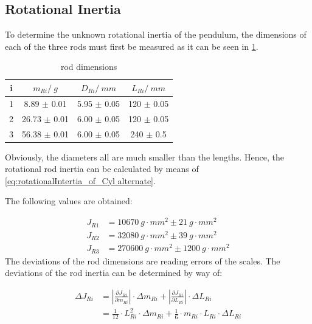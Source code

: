         \subsection{Rotational Inertia}
            To determine the unknown rotational inertia of the pendulum, the dimensions of each of the three rods must first be measured
            as it can be seen in \cref{rod dimensions}.\par
            \begin{table}[H]
                \centering
                \caption{rod dimensions}
                \label{rod dimensions}
                \begin{tabular}{|c|c|c|c|}
                    \hline
                    i & $ m_{Ri} / \SI{}{g} $ & $ D_{Ri} / \SI{}{mm} $ & $ L_{Ri} / \SI{}{mm} $ \\
                    \hline
                    \hline
                    1 & 8.89 $\pm$ 0.01 & 5.95 $\pm$ 0.05 & 120 $\pm$ 0.05 \\
                    \hline
                    2 & 26.73 $\pm$ 0.01 & 6.00 $\pm$ 0.05 & 120 $\pm$ 0.05 \\
                    \hline
                    3 & 56.38 $\pm$ 0.01 & 6.00 $\pm$ 0.05 & 240 $\pm$ 0.5 \\
                    \hline
                \end{tabular}
            \end{table}
            Obviously, the diameters all are much smaller than the lengths. Hence, the rotational rod inertia can be calculated
            by means of \cref{eq:rotationalIntertia_of_Cyl alternate}.\par
            The following values are obtained:\par
            \begin{align}
                J_{R1}  &=\SI{10670}{g\cdot mm^2} \pm \SI{21}{g\cdot mm^2}\\
                J_{R2}  &=\SI{32080}{g\cdot mm^2} \pm \SI{39}{g\cdot mm^2}\\
                J_{R3}  &=\SI{270600}{g\cdot mm^2} \pm \SI{1200}{g\cdot mm^2}
            \end{align}
            The deviations of the rod dimensions are reading errors of the scales. The deviations of the rod inertia can be determined by way of:\par
            \begin{align}
                \Delta J_{Ri}   &=\left| \frac{\partial J_{Ri}}{\partial m_{Ri}} \right| \cdot \Delta m_{Ri} + \left| \frac{\partial J_{Ri}}{\partial L_{Ri}} \right| \cdot \Delta L_{Ri} \nonumber\\
                                &=\frac{1}{12}\cdot L_{Ri}^2\cdot \Delta m_{Ri} + \frac{1}{6}\cdot m_{Ri}\cdot L_{Ri}\cdot \Delta L_{Ri}
            \end{align}
